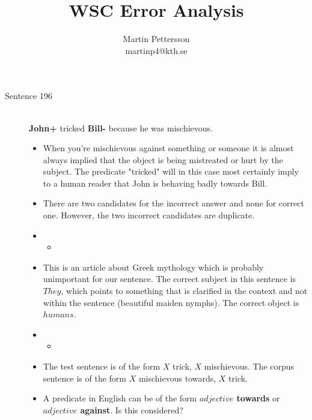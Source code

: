 \documentclass{article}
\newcommand{\insertcode}[2]{\begin{itemize}\item[]\end{itemize}} %
\begin{document}
\title{WSC Error Analysis}
\author{Martin Pettersson\\martinp4@kth.se}
\maketitle



\begin{description}
  \item[Sentence 196] \hfill \\
  {\bf John+} tricked {\bf Bill-} because he was mischievous.
  \begin{itemize}
  	\item When you're mischievous against something or someone it is almost always implied that the object is being mistreated or hurt by the subject. The predicate "tricked" will in this case most certainly imply to a human reader that John is behaving badly towards Bill.
  	\item There are two candidates for the incorrect answer and none for correct one. However, the two incorrect candidates are duplicate.
  	\item \insertcode{"Scripts/196/196-1.sentence"}{Context for $R_1$ and $R_2$ (duplicates).}
  	\item This is an article about Greek mythology which is probably unimportant for our sentence. The correct subject in this sentence is $They$, which points to something that is clarified in the context and not within the sentence (beautiful maiden nymphs). The correct object is $humans$. 
  	\item \insertcode{"Scripts/196/196-2.sentence"}{Target sentence in $R_1$ and $R_2$.}
  	\item The test sentence is of the form $X$ trick, $X$ mischievous. The corpus sentence is of the form $X$ mischievous towards, $X$ trick.
  	\item A predicate in English can be of the form {\bf $adjective$ towards} or {\bf $adjective$ against}. Is this considered?
  \end{itemize}


\end{description}
\end{document}
